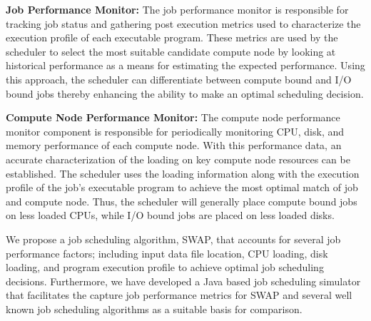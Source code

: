 	\noindent \textbf{Job Performance Monitor:}
	The job performance monitor is responsible for tracking job status and gathering
    post execution metrics used to characterize the execution profile of each executable program.  These metrics are used by the scheduler to select the most suitable candidate compute node by looking at historical performance as a means for estimating the expected performance.  Using this approach, the scheduler can differentiate between compute bound and I/O bound jobs thereby enhancing the ability to make an optimal scheduling decision.
	
	\noindent \textbf{Compute Node Performance Monitor:}
	The compute node performance monitor component is responsible for periodically
    monitoring CPU, disk, and memory performance of each compute node.  With this performance data, an accurate characterization of the loading on key compute node resources can be established.  The scheduler uses the loading information along with the execution profile of the job's executable program to achieve the most optimal match of job and compute node.  Thus, the scheduler will generally place compute bound jobs on less loaded CPUs, while I/O bound jobs are placed on less loaded disks.

We propose a job scheduling algorithm, SWAP, that accounts for several job performance factors; including input data file location, CPU loading, disk loading, and program execution profile to achieve optimal job scheduling decisions.  Furthermore, we have developed a Java based job scheduling simulator that facilitates the capture job performance metrics for SWAP and several well known job scheduling algorithms as a suitable basis for comparison. 